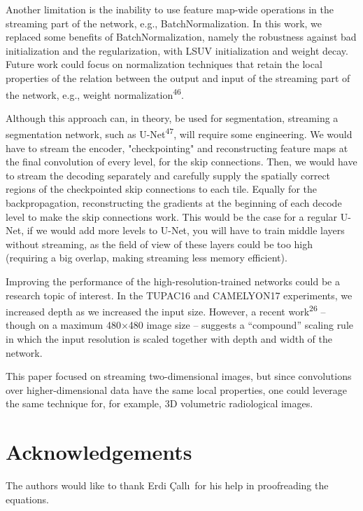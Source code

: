 \documentclass[
  12pt,
  a5,margin=2cmpaper,
]{article}
\begin{document}
Another limitation is the inability to use feature map-wide operations
in the streaming part of the network, e.g., BatchNormalization. In this
work, we replaced some benefits of BatchNormalization, namely the
robustness against bad initialization and the regularization, with LSUV
initialization and weight decay. Future work could focus on
normalization techniques that retain the local properties of the
relation between the output and input of the streaming part of the
network, e.g., weight normalization\textsuperscript{46}.

Although this approach can, in theory, be used for segmentation,
streaming a segmentation network, such as U-Net\textsuperscript{47},
will require some engineering. We would have to stream the encoder,
"checkpointing" and reconstructing feature maps at the final convolution
of every level, for the skip connections. Then, we would have to stream
the decoding separately and carefully supply the spatially correct
regions of the checkpointed skip connections to each tile. Equally for
the backpropagation, reconstructing the gradients at the beginning of
each decode level to make the skip connections work. This would be the
case for a regular U-Net, if we would add more levels to U-Net, you will
have to train middle layers without streaming, as the field of view of
these layers could be too high (requiring a big overlap, making
streaming less memory efficient).

Improving the performance of the high-resolution-trained networks could
be a research topic of interest. In the TUPAC16 and CAMELYON17
experiments, we increased depth as we increased the input size. However,
a recent work\textsuperscript{26} -- though on a maximum
480\(\times\)480 image size -- suggests a ``compound'' scaling rule in
which the input resolution is scaled together with depth and width of
the network.

This paper focused on streaming two-dimensional images, but since
convolutions over higher-dimensional data have the same local
properties, one could leverage the same technique for, for example, 3D
volumetric radiological images.

\hypertarget{acknowledgements}{%
\section{Acknowledgements}\label{acknowledgements}}

The authors would like to thank Erdi Çallı~for his help in proofreading
the equations.
\end{document}

